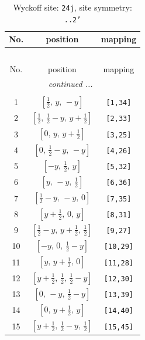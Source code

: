 \documentclass[fleqn,8pt]{jsarticle}
\begin{document}
\begin{longtable}{ccc}
\caption{Wyckoff site: {\tt 24j}, site symmetry: {\tt ..2'}}
 \\
 \hline \hline
No. & position & mapping \\ \hline \endfirsthead

\multicolumn{2}{l}{\tablename\ \thetable{}} \\
 \hline \hline
No. & position & mapping \\ \hline \endhead

 \hline \hline
\multicolumn{2}{r}{\footnotesize\it continued ...} \\ \endfoot

 \hline \hline
\multicolumn{2}{r}{} \\ \endlastfoot

1 & $\left[ \frac{1}{2},\, y,\, - y \right]$ & {\tt [1,34]} \\ \hline
2 & $\left[ \frac{1}{2},\, \frac{1}{2} - y,\, y + \frac{1}{2} \right]$ & {\tt [2,33]} \\ \hline
3 & $\left[ 0,\, y,\, y + \frac{1}{2} \right]$ & {\tt [3,25]} \\ \hline
4 & $\left[ 0,\, \frac{1}{2} - y,\, - y \right]$ & {\tt [4,26]} \\ \hline
5 & $\left[ - y,\, \frac{1}{2},\, y \right]$ & {\tt [5,32]} \\ \hline
6 & $\left[ y,\, - y,\, \frac{1}{2} \right]$ & {\tt [6,36]} \\ \hline
7 & $\left[ \frac{1}{2} - y,\, - y,\, 0 \right]$ & {\tt [7,35]} \\ \hline
8 & $\left[ y + \frac{1}{2},\, 0,\, y \right]$ & {\tt [8,31]} \\ \hline
9 & $\left[ \frac{1}{2} - y,\, y + \frac{1}{2},\, \frac{1}{2} \right]$ & {\tt [9,27]} \\ \hline
10 & $\left[ - y,\, 0,\, \frac{1}{2} - y \right]$ & {\tt [10,29]} \\ \hline
11 & $\left[ y,\, y + \frac{1}{2},\, 0 \right]$ & {\tt [11,28]} \\ \hline
12 & $\left[ y + \frac{1}{2},\, \frac{1}{2},\, \frac{1}{2} - y \right]$ & {\tt [12,30]} \\ \hline
13 & $\left[ 0,\, - y,\, \frac{1}{2} - y \right]$ & {\tt [13,39]} \\ \hline
14 & $\left[ 0,\, y + \frac{1}{2},\, y \right]$ & {\tt [14,40]} \\ \hline
15 & $\left[ y + \frac{1}{2},\, \frac{1}{2} - y,\, \frac{1}{2} \right]$ & {\tt [15,45]} \\ \hline

\end{longtable}
\end{document}
